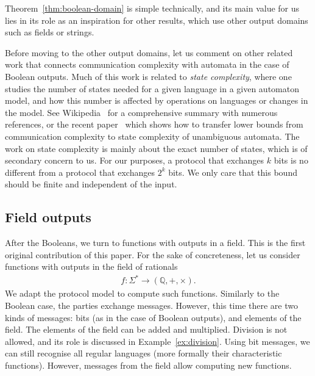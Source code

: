 Theorem~\ref{thm:boolean-domain} is  simple  technically, and its main value for us lies in its role as an inspiration for other results, which use  other output domains  such as  fields or strings. 



Before moving to the other output domains, let us comment on other related work that connects communication complexity with automata in the case of Boolean outputs.  Much of this work is related to \emph{state complexity}, where one studies  the number of states needed for a given language in a given automaton model, and how this number is affected by operations on languages or changes in the model. See  Wikipedia~\cite{stateComplexityWiki} for a comprehensive summary with numerous references, or the recent paper~\cite{goosKiefer2022} which shows how to transfer lower bounds from communication complexity to state complexity of unambiguous automata. 
 The work on state complexity is mainly about the exact number of states, which is of secondary concern to us. For our purposes, a protocol that exchanges $k$ bits is no different from a protocol that exchanges $2^k$ bits. We only care that this bound should be finite and independent of the input.



\subsection{Field outputs}
\label{sec:intro-field}



After the Booleans, we turn to functions with outputs in a field. This is the first original contribution of this paper. For the sake of concreteness, let us  consider functions with outputs in the  field of rationals
\begin{align*}
f : \Sigma^* \to (\mathbb Q, +, \times).
\end{align*}
We adapt the  protocol model to  compute such functions. Similarly to the Boolean case, the parties exchange messages. However, this time there are two kinds of messages: bits (as in the case of  Boolean outputs), and  elements of the field.  The elements of the field can be added and multiplied.  Division is not allowed, and its role is discussed in Example~\ref{ex:division}. Using bit messages, we can still recognise all regular languages (more formally their characteristic functions).
However, messages from the field allow computing new functions.

